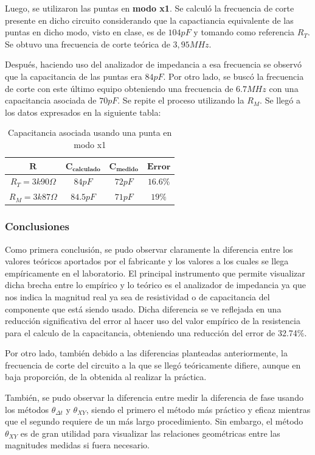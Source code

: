 \documentclass[11pt, a4paper]{article}
\begin{document}
Luego, se utilizaron las puntas en \textbf{modo x1}. Se calculó la frecuencia de corte presente en dicho circuito considerando que la capactiancia equivalente de las puntas en dicho modo, visto en clase, es de $104pF$ y tomando como referencia $R_T$. Se obtuvo una frecuencia de corte teórica de $3,95MHz$. \par Después, haciendo uso del analizador de impedancia a esa frecuencia se observó que la capacitancia de las puntas era $84pF$. Por otro lado, se buscó la frecuencia de corte con este último equipo obteniendo una frecuencia de $6.7MHz$ con una capacitancia asociada de $70pF$. Se repite el proceso utilizando la $R_M$. Se llegó a los datos expresados en la siguiente tabla:
 \begin{center}
     \begin{table}[ht]
     \centering
	 \renewcommand{\arraystretch}{1.1}
         \begin{tabular}{ c c c c}
            \hline 
             $\bm{R}$ &  $\bm{C_{calculado}}$ &    $\bm{C_{medido}}$   &  $\bm{Error}$\\ \hline
             $R_T = 3k90\Omega$  & $84 pF$ & $72 pF$ & $16.6\%$ \\  
             $R_M = 3k87\Omega$ & $84.5 pF$ & $71 pF$ & $19 \%$ \\   \hline
        \end{tabular}
        \caption{Capacitancia asociada usando una punta en modo x1}
        \label{table:valores_punta_x1}
    \end{table}
\end{center}


\subsubsection*{Conclusiones}
Como primera conclusión, se pudo observar claramente la diferencia entre los valores teóricos aportados por el fabricante y los valores a los cuales se llega empíricamente en el laboratorio. El principal instrumento que permite visualizar dicha brecha entre lo empírico y lo teórico es el analizador de impedancia ya que nos indica la magnitud real ya sea de resistividad o de capacitancia del componente que está siendo usado. Dicha diferencia se ve reflejada en una reducción significativa del error al hacer uso del valor empírico de la resistencia para el calculo de la capacitancia, obteniendo una reducción del error de 32.74\%. \par
Por otro lado, también debido a las diferencias planteadas anteriormente, la frecuencia de corte del circuito a la que se llegó teóricamente difiere, aunque en baja proporción, de la obtenida al realizar la práctica. 
\par
También, se pudo observar la diferencia entre medir la diferencia de fase usando los métodos $\theta_{\Delta t}$ y $\theta_{XY}$, siendo el primero el método más práctico y eficaz mientras que el segundo requiere de un más largo procedimiento. Sin embargo, el método $\theta_{XY}$ es de gran utilidad para visualizar las relaciones geométricas entre las magnitudes medidas si fuera necesario.
\par
\end{document}
